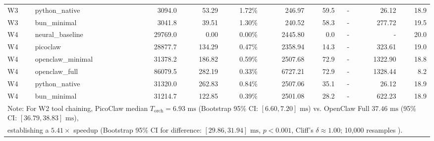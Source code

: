 \begin{table}[t]
\begin{tabular}{llrrrrrrrr}
W3 & python\_native & 3094.0 & 53.29 & 1.72\% & 246.97 & 59.5 & - & 26.12 & 18.9 \\
W3 & bun\_minimal & 3041.8 & 39.51 & 1.30\% & 240.52 & 58.3 & - & 277.72 & 19.5 \\
\midrule
W4 & neural\_baseline & 29769.0 & 0.00 & 0.00\% & 2445.80 & 0.0 & - & - & 20.0 \\
W4 & picoclaw & 28877.7 & 134.29 & 0.47\% & 2358.94 & 14.3 & - & 323.61 & 19.0 \\
W4 & openclaw\_minimal & 31378.2 & 186.82 & 0.59\% & 2507.68 & 72.9 & - & 1322.90 & 18.8 \\
W4 & openclaw\_full & 86079.5 & 282.19 & 0.33\% & 6727.21 & 72.9 & - & 1328.44 & 8.2 \\
W4 & python\_native & 31320.0 & 262.83 & 0.84\% & 2507.06 & 35.1 & - & 26.12 & 18.9 \\
W4 & bun\_minimal & 31214.7 & 122.85 & 0.39\% & 2501.08 & 28.2 & - & 622.23 & 18.9 \\
\midrule
\multicolumn{10}{l}{\footnotesize Note: For W2 tool chaining, PicoClaw median $T_{\text{orch}} = 6.93\text{ ms}$ (Bootstrap 95\% CI: $[6.60, 7.20]\text{ ms}$) vs. OpenClaw Full $37.46\text{ ms}$ (95\% CI: $[36.79, 38.83]\text{ ms}$),} \\
\multicolumn{10}{l}{\footnotesize establishing a $5.41\times$ speedup (Bootstrap 95\% CI for difference: $[29.86, 31.94]\text{ ms}$, $p < 0.001$, Cliff's $\delta \approx 1.00$; 10,000 resamples \cite{efron1979}).} \\
\bottomrule
\end{tabular}
\end{table}

